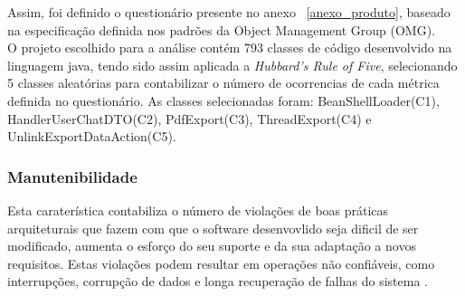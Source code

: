 \documentclass[openany,10pt,a4paper]{article}
\begin{document}
Assim, foi definido o questionário presente no anexo ~\ref{anexo_produto}, baseado na especificação definida nos padrões da Object Management Group (OMG). \\
O projeto escolhido para a análise contém 793 classes de código desenvolvido na linguagem java, tendo sido assim aplicada a 
\textit{Hubbard’s Rule of Five}, selecionando 5 classes aleatórias para contabilizar o número de ocorrencias de cada métrica definida no questionário. As classes selecionadas foram: BeanShellLoader(C1), HandlerUserChatDTO(C2), PdfExport(C3), ThreadExport(C4) e UnlinkExportDataAction(C5).\\

\subsubsection{Manutenibilidade}
Esta caraterística contabiliza o número de violações de boas práticas arquiteturais que fazem com que o software desenvovlido seja dificil de ser modificado, aumenta o esforço do seu suporte e da sua adaptação a novos requisitos. Estas violações podem resultar em operações não confiáveis, como interrupções, corrupção de dados e longa recuperação de falhas do sistema \cite{OMG_Maintainability}.
\end{document}
